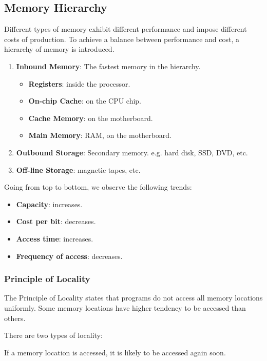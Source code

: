 \subsection{Memory Hierarchy}

Different types of memory exhibit different performance and impose different costs
of production. To achieve a balance between performance and cost, a hierarchy of
memory is introduced.

\begin{enumerate}
    \item \textbf{Inbound Memory}: The fastest memory in the hierarchy.
    \begin{itemize}
        \item \textbf{Registers}: inside the processor.
        \item \textbf{On-chip Cache}: on the CPU chip.
        \item \textbf{Cache Memory}: on the motherboard.
        \item \textbf{Main Memory}: RAM, on the motherboard.
    \end{itemize}
    \item \textbf{Outbound Storage}: Secondary memory. e.g. hard disk, SSD, DVD, etc.
    \item \textbf{Off-line Storage}: magnetic tapes, etc.
\end{enumerate}

Going from top to bottom, we observe the following trends:
\begin{itemize}
    \item \textbf{Capacity}: increases.
    \item \textbf{Cost per bit}: decreases.
    \item \textbf{Access time}: increases.
    \item \textbf{Frequency of access}: decreases.
\end{itemize}

\subsubsection{Principle of Locality}

\begin{definition}
    The Principle of Locality states that programs do not access all memory locations
    uniformly. Some memory locations have higher tendency to be accessed than others.
\end{definition}

There are two types of locality:
\begin{definition}
    If a memory location is accessed, it is likely to be accessed again soon.
\end{definition}


